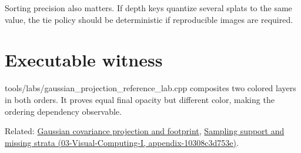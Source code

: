 Sorting precision also matters. If depth keys quantize several splats to the same value, the tie policy should be deterministic if reproducible images are required.

\section{Executable witness}\label{appendix-5f4b2e24c3f6-executable-witness}

tools/labs/gaussian\_projection\_reference\_lab.cpp composites two colored layers in both orders. It proves equal final opacity but different color, making the ordering dependency observable.

Related: \hyperref[appendix-24269cb6977c]{Gaussian covariance projection and footprint}, \href{../03-Visual-Computing-I/main.pdf\#nameddest=appendix-10308c3d753e}{Sampling support and missing strata (03-Visual-Computing-I, appendix-10308c3d753e)}.
